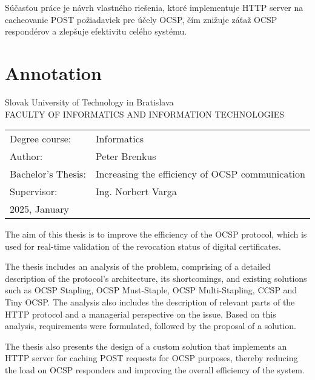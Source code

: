 \documentclass[12pt, twoside]{book}
\def\mferok{2025, January}
\def\mfenazov{Increasing the efficiency of OCSP communication}
\def\mfautor{Peter Brenkus}
\def\mfeveduci{Ing. Norbert Varga}
\begin{document}
Súčasťou práce je návrh vlastného riešenia, ktoré implementuje HTTP server na cacheovanie POST požiadaviek pre účely OCSP, čím znižuje záťaž OCSP respondérov a zlepšuje efektivitu celého systému.


\newpage\null\thispagestyle{empty}\newpage



\newpage
\thispagestyle{empty}
 
\section*{Annotation}
\noindent
Slovak University of Technology in Bratislava\\
FACULTY OF INFORMATICS AND INFORMATION TECHNOLOGIES\\

\begin{tabular}{@{}ll}
Degree course: & Informatics\bigskip
\bigskip  \\
Author: & \mfautor \\
Bachelor’s Thesis: & \mfenazov \\
Supervisor: & \mfeveduci \\
\mferok
\end{tabular}

\bigskip
\bigskip 
\bigskip 
\noindent

The aim of this thesis is to improve the efficiency of the OCSP protocol, which is used for real-time validation of the revocation status of digital certificates.

The thesis includes an analysis of the problem, comprising of a detailed description of the protocol’s architecture, its shortcomings, and existing solutions such as OCSP Stapling, OCSP Must-Staple, OCSP Multi-Stapling, CCSP and Tiny OCSP. The analysis also includes the description of relevant parts of the HTTP protocol and a managerial perspective on the issue. Based on this analysis, requirements were formulated, followed by the proposal of a solution.

The thesis also presents the design of a custom solution that implements an HTTP server for caching POST requests for OCSP purposes, thereby reducing the load on OCSP responders and improving the overall efficiency of the system.

 
\newpage\null\thispagestyle{empty}\newpage

\end{document}
